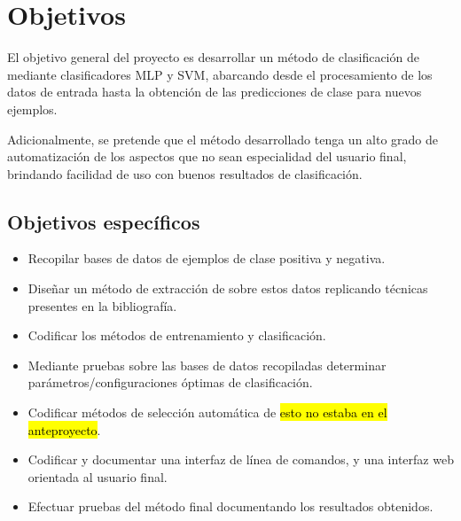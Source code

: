 %
%
%
\section{Objetivos}
%
El objetivo general del proyecto es desarrollar un método de
clasificación de  mediante clasificadores MLP y SVM,
abarcando desde el procesamiento de los datos de entrada hasta la
obtención de las predicciones de clase para nuevos ejemplos.

Adicionalmente, se pretende que el método desarrollado tenga un alto
grado de automatización de los aspectos que no sean especialidad del
usuario final, brindando facilidad de uso con buenos resultados de
clasificación.
%
%
\subsection{Objetivos específicos}
%
\begin{itemize}
\item Recopilar bases de datos de ejemplos de clase positiva y
  negativa.
\item Diseñar un método de extracción de  sobre estos datos
  replicando técnicas presentes en la bibliografía.
\item Codificar los métodos de entrenamiento y clasificación.
\item Mediante pruebas sobre las bases de datos recopiladas determinar
  parámetros/configuraciones óptimas de clasificación.
\item Codificar métodos de selección automática de 
  \hl{esto no estaba en el anteproyecto}.
\item Codificar y documentar una interfaz de línea de comandos, y una
  interfaz web orientada al usuario final.
\item Efectuar pruebas del método final documentando los resultados
  obtenidos.
\end{itemize}
%
